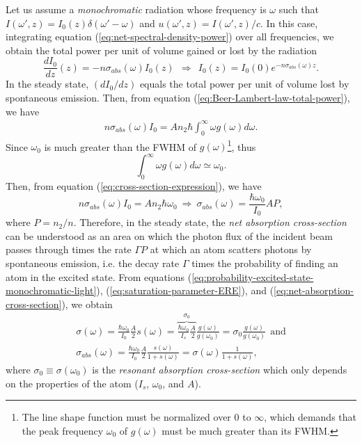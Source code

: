 Let us assume a \textit{monochromatic} radiation whose frequency is $ \omega $ such that $  I(\omega', z) = I_0(z) \delta(\omega' - \omega) $ and $ u(\omega', z) = I(\omega', z) / c $. In this case, integrating equation (\ref{eq:net-spectral-density-power}) over all frequencies, we obtain the total power per unit of volume gained or lost by the radiation
\begin{equation}
	\frac{d I_0}{dz}(z) = -n\sigma_{abs}(\omega)I_0(z)\ \ \Rightarrow\ \ I_0(z) = I_0(0) e^{- n\sigma_{abs}(\omega)z}.
	\label{eq:Beer-Lambert-law-total-power}
\end{equation}
In the steady state, $ (dI_0/dz) $ equals the total power per unit of volume lost by spontaneous emission. Then, from equation (\ref{eq:Beer-Lambert-law-total-power}), we have
\begin{gather}
	n\sigma_{abs}(\omega) I_0 = A n_2 \hbar \int_0^{\infty} \omega g(\omega)d\omega.
	\label{eq:cross-section-expression}
\end{gather}
Since $ \omega_0 $ is much greater than the FWHM of $ g(\omega) $\footnote{The line shape function must be normalized over $ 0 $ to $ \infty $, which demands that the peak frequency $ \omega_0 $ of $ g(\omega) $ must be much greater than its FWHM.}, thus
\begin{equation}
	\int_0^{\infty} \omega g(\omega)d\omega \simeq \omega_0.
\end{equation}
Then, from equation (\ref{eq:cross-section-expression}), we have
\begin{equation}
	n \sigma_{abs}(\omega) I_0 = A n_2 \hbar \omega_0\ \Rightarrow\ \sigma_{abs}(\omega) = \frac{\hbar \omega_0}{I_0} A P,
	\label{eq:net-absorption-cross-section}
\end{equation}
where $ P = n_2 / n $. Therefore, in the steady state, the \textit{net absorption cross-section} can be understood as an area on which the photon flux of the incident beam passes through times the rate $ \Gamma P $ at which an atom scatters photons by spontaneous emission, i.e. the decay rate $ \Gamma $ times the probability of finding an atom in the excited state. From equations (\ref{eq:probability-excited-state-monochromatic-light}), (\ref{eq:saturation-parameter-ERE}), and (\ref{eq:net-absorption-cross-section}), we obtain
\begin{gather}
	\sigma(\omega) = \frac{\hbar \omega_0}{I_0} \frac{A}{2} s(\omega) = \overbrace{\frac{\hbar \omega_0}{I_s} \frac{A}{2}}^{\sigma_0} \frac{g(\omega)}{g(\omega_0)} = \sigma_0 \frac{g(\omega)}{g(\omega_0)}\ \ \textrm{and}
	\label{eq:absorption-cross-section-2}
	\\
	\sigma_{abs}(\omega) = \frac{\hbar \omega_0}{I_0} \frac{A}{2} \frac{s(\omega)}{1 + s(\omega)} = \sigma(\omega) \frac{1}{1 + s(\omega)},
	\label{eq:net-absorption-cross-section-2}
\end{gather}
where $ \sigma_0 \equiv \sigma(\omega_0) $ is the \textit{resonant absorption cross-section} which only depends on the properties of the atom ($ I_s$, $ \omega_0 $, and $ A $).



